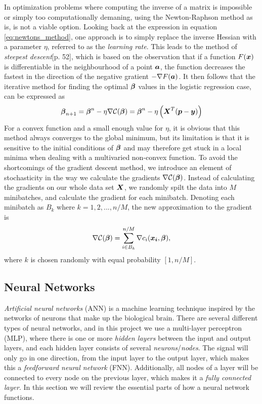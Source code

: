 In optimization problems where computing the inverse of a matrix is impossible or simply too computationally demaning, using the Newton-Raphson method as is, is not a viable option. Looking back at the expression in equation \ref{eq:newtons_method}, one approach is to simply replace the inverse Hessian with a parameter $\eta$, referred to as the \textit{learning rate}. This leads to the method of \textit{steepest descent}\cite{Faul}[p. 52], which is based on the observation that if a function $F(\boldsymbol{x})$ is differentiable in the neighbourhood of a point $\boldsymbol{a}$, the function decreases the fastest in the direction of the negative gratient $-\nabla F(\boldsymbol{a})$. It then follows that the iterative method for finding the optimal $\boldsymbol{\beta}$ values in the logistic regression case, can be expressed as
\begin{align}
\label{gradient_descent}
    \boldsymbol{\beta}_{n+1} = \boldsymbol{\beta}^n - \eta \nabla\mathcal{C}(\boldsymbol{\beta}) = \boldsymbol{\beta}^n - \eta \left( \boldsymbol{X}^T(\boldsymbol{p} - \boldsymbol{y}) \right)
\end{align}
For a convex function and a small enough value for $\eta$, it is obvious that this method always converges to the global minimum, but its limitation is that it is sensitive to the initial conditions of $\boldsymbol{\beta}$ and may therefore get stuck in a local minima when dealing with a multivaried non-convex function. To avoid the shortcomings of the gradient descent method, we introduce an element of stochasticity in the way we calculate the gradients $\nabla \mathcal{C}(\boldsymbol{\beta})$. Instead of calculating the gradients on our whole data set $\boldsymbol{X}$, we randomly spilt the data into $M$ minibatches, and calculate the gradient for each minibatch. Denoting each minibatch as $B_k$ where $k=1, 2, ..., n/M$, the new approximation to the gradient is
\begin{align}
    \nabla \mathcal{C}(\boldsymbol{\beta}) = \sum_{i\in B_k}^{n/M} \nabla c_i(\boldsymbol{x_i}, \boldsymbol{\beta}),
\end{align}
where $k$ is chosen randomly with equal probability $[1, n/M]$.



\subsection{Neural Networks}


\emph{Artificial neural networks} (ANN) is a machine learning technique
inspired by the networks of neurons that make up the biological brain.
There are several different types of neural networks, and in this
project we use a multi-layer perceptron (MLP), where there is one or
more \emph{hidden layers} between the input and output layers, and each
hidden layer consists of several \emph{neurons}/\emph{nodes}. The signal will only go
in one direction, from the input layer to the output layer, which makes
this a \emph{feedforward neural network} (FNN). Additionally, all
nodes of a layer will be connected to every node on the previous
layer, which makes it a \emph{fully connected layer}. In this section we
will review the essential parts of how a neural network functions.


